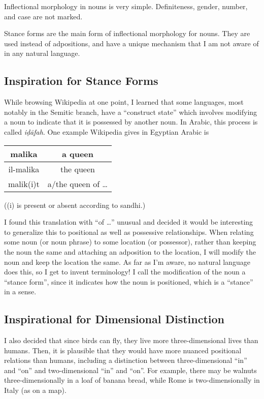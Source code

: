 Inflectional morphology in nouns is very simple.
Definiteness, gender, number, and case are not marked.

Stance forms are the main form of inflectional morphology for nouns.
They are used instead of adpositions,
and have a unique mechanism that I am not aware of in any natural language.

\subsection{Inspiration for Stance Forms}\label{subsec:inspiration-for-stance-forms}

While browsing Wikipedia at one point,
I learned that some languages, most notably in the Semitic branch,
have a ``construct state''
which involves modifying a noun to indicate
that it is possessed by another noun.
In Arabic, this process is called \textit{iḍāfah}.
One example Wikipedia gives in Egyptian Arabic is
\begin{center}
    \begin{tabular}{|c|c|}
        \hline
        malika    & a queen              \\
        \hline
        il-malika & the queen            \\
        \hline
        malik(i)t & a/the queen of \dots \\
        \hline
    \end{tabular}
\end{center}
((i) is present or absent according to sandhi.)

I found this translation with ``of \dots'' unusual
and decided it would be interesting to generalize this to
positional as well as possessive relationships.
When relating some noun (or noun phrase) to some location (or possessor),
rather than keeping the noun the same
and attaching an adposition to the location,
I will modify the noun and keep the location the same.
As far as I'm aware, no natural language does this,
so I get to invent terminology!
I call the modification of the noun a ``stance form'',
since it indicates how the noun is positioned,
which is a ``stance'' in a sense.

\subsection{Inspirational for Dimensional Distinction}\label{subsec:inspirational-for-dimensional-distinction}

I also decided that since birds can fly,
they live more three-dimensional lives than humans.
Then, it is plausible that they would have
more nuanced positional relations than humans,
including a distinction between three-dimensional ``in'' and ``on''
and two-dimensional ``in'' and ``on''.
For example,
there may be walnuts three-dimensionally in a loaf of banana bread,
while Rome is two-dimensionally in Italy (as on a map).

